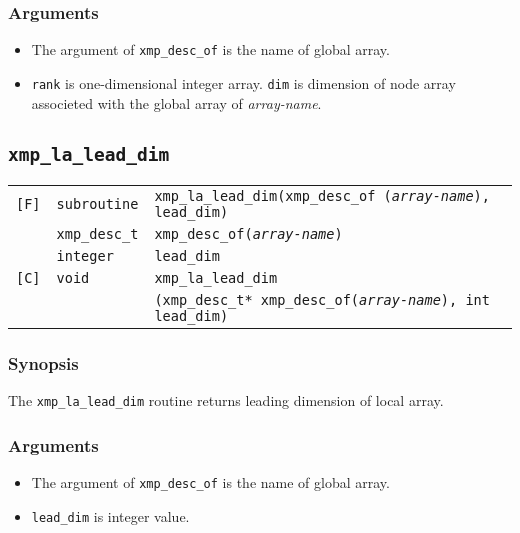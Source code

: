 \begin{description}
\subsubsection*{Arguments}

\begin{itemize}
 \item The argument of {\tt xmp\_desc\_of} is the name of global array.
 \item {\tt rank} is one-dimensional integer array. {\tt dim} is dimension of 
 node array associeted with the global array of {\it array-name}.
\end{itemize}


\subsection{\tt xmp\_la\_lead\_dim}

\begin{tabular}{lll}

\verb![F]!&  {\tt subroutine}& {\tt xmp\_la\_lead\_dim(xmp\_desc\_of
({\it array-name}), lead\_dim)}\\
          & {\tt xmp\_desc\_t} & {\tt xmp\_desc\_of({\it array-name})}\\
          & {\tt integer} & {\tt lead\_dim}\\

\verb![C]!&  {\tt void}& {\tt xmp\_la\_lead\_dim}\\
          & & {\tt (xmp\_desc\_t* xmp\_desc\_of({\it array-name}), int lead\_dim)}\\

\end{tabular}

\subsubsection*{Synopsis}

The {\tt xmp\_la\_lead\_dim} routine returns leading dimension of local array.

\subsubsection*{Arguments}

\begin{itemize}
 \item The argument of {\tt xmp\_desc\_of} is the name of global array.
 \item {\tt lead\_dim} is integer value.
\end{itemize}


\end{description}
